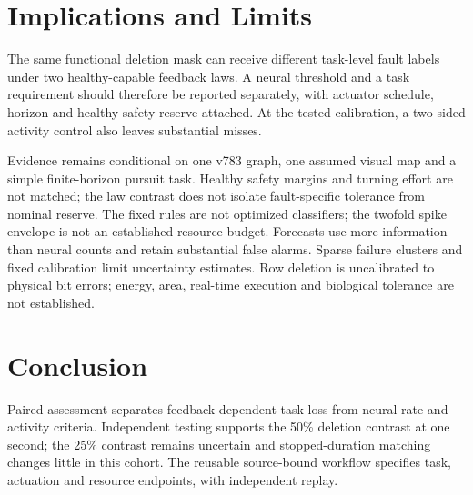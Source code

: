 \section{Implications and Limits}
The same functional deletion mask can receive different task-level fault labels under two healthy-capable feedback laws. A neural threshold and a task requirement should therefore be reported separately, with actuator schedule, horizon and healthy safety reserve attached. At the tested calibration, a two-sided activity control also leaves substantial misses.

Evidence remains conditional on one v783 graph, one assumed visual map and a simple finite-horizon pursuit task. Healthy safety margins and turning effort are not matched; the law contrast does not isolate fault-specific tolerance from nominal reserve. The fixed rules are not optimized classifiers; the twofold spike envelope is not an established resource budget. Forecasts use more information than neural counts and retain substantial false alarms. Sparse failure clusters and fixed calibration limit uncertainty estimates. Row deletion is uncalibrated to physical bit errors; energy, area, real-time execution and biological tolerance are not established.

\section{Conclusion}
Paired assessment separates feedback-dependent task loss from neural-rate and activity criteria. Independent testing supports the 50\% deletion contrast at one second; the 25\% contrast remains uncertain and stopped-duration matching changes little in this cohort. The reusable source-bound workflow specifies task, actuation and resource endpoints, with independent replay.
